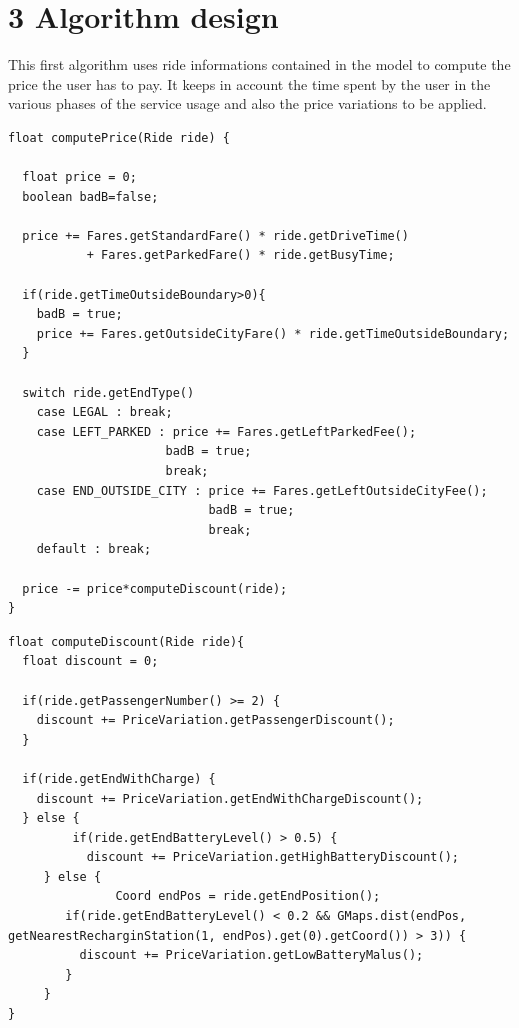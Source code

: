 \documentclass[]{article}
\begin{document}
\newpage

\section{3 Algorithm design}\label{algorithm-design}

This first algorithm uses ride informations contained in the model to
compute the price the user has to pay. It keeps in account the time
spent by the user in the various phases of the service usage and also
the price variations to be applied.

\begin{lstlisting}
float computePrice(Ride ride) {

  float price = 0;
  boolean badB=false;

  price += Fares.getStandardFare() * ride.getDriveTime()
           + Fares.getParkedFare() * ride.getBusyTime;

  if(ride.getTimeOutsideBoundary>0){
    badB = true;
    price += Fares.getOutsideCityFare() * ride.getTimeOutsideBoundary;
  }

  switch ride.getEndType()
    case LEGAL : break;
    case LEFT_PARKED : price += Fares.getLeftParkedFee();
                      badB = true;
                      break;
    case END_OUTSIDE_CITY : price += Fares.getLeftOutsideCityFee();
                            badB = true;
                            break;
    default : break;

  price -= price*computeDiscount(ride);
}
\end{lstlisting}

\newpage

\begin{lstlisting}
float computeDiscount(Ride ride){
  float discount = 0;

  if(ride.getPassengerNumber() >= 2) {
    discount += PriceVariation.getPassengerDiscount();
  }

  if(ride.getEndWithCharge) {
    discount += PriceVariation.getEndWithChargeDiscount();
  } else {
         if(ride.getEndBatteryLevel() > 0.5) {
           discount += PriceVariation.getHighBatteryDiscount();
     } else {
               Coord endPos = ride.getEndPosition();
        if(ride.getEndBatteryLevel() < 0.2 && GMaps.dist(endPos, getNearestRecharginStation(1, endPos).get(0).getCoord()) > 3)) {
          discount += PriceVariation.getLowBatteryMalus();
        }
     }      
}
\end{lstlisting}

\newpage
\end{document}
